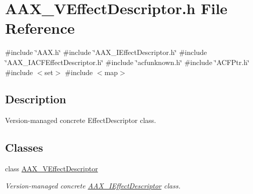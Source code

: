 \hypertarget{a00704}{}\section{A\+A\+X\+\_\+\+V\+Effect\+Descriptor.\+h File Reference}
\label{a00704}
{\ttfamily \#include \char`\"{}A\+A\+X.\+h\char`\"{}}\newline
{\ttfamily \#include \char`\"{}A\+A\+X\+\_\+\+I\+Effect\+Descriptor.\+h\char`\"{}}\newline
{\ttfamily \#include \char`\"{}A\+A\+X\+\_\+\+I\+A\+C\+F\+Effect\+Descriptor.\+h\char`\"{}}\newline
{\ttfamily \#include \char`\"{}acfunknown.\+h\char`\"{}}\newline
{\ttfamily \#include \char`\"{}A\+C\+F\+Ptr.\+h\char`\"{}}\newline
{\ttfamily \#include $<$set$>$}\newline
{\ttfamily \#include $<$map$>$}\newline


\subsection{Description}
Version-\/managed concrete Effect\+Descriptor class. 

\subsection*{Classes}
\begin{DoxyCompactItemize}
\item 
class \mbox{\hyperlink{a01913}{A\+A\+X\+\_\+\+V\+Effect\+Descriptor}}
\begin{DoxyCompactList}\small\item\em Version-\/managed concrete \mbox{\hyperlink{a01813}{A\+A\+X\+\_\+\+I\+Effect\+Descriptor}} class. \end{DoxyCompactList}\end{DoxyCompactItemize}
